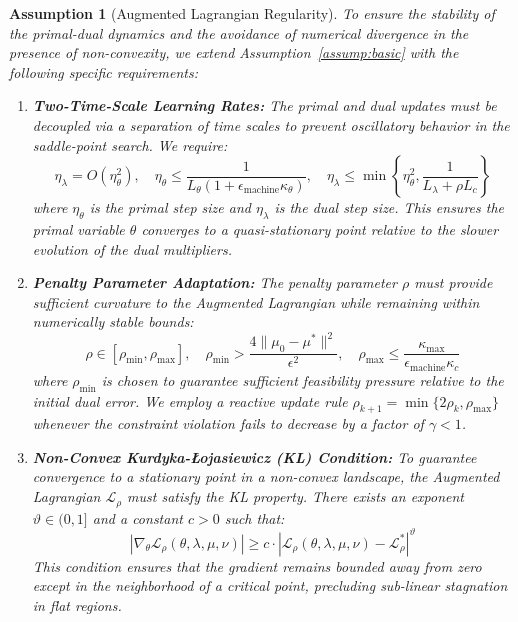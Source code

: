\documentclass[preprint,12pt,authoryear]{elsarticle}
\newtheorem{assumption}{Assumption}
\begin{document}
\begin{assumption}[Augmented Lagrangian Regularity]\label{assump:auglag}
To ensure the stability of the primal-dual dynamics and the avoidance of numerical divergence in the presence of non-convexity, we extend Assumption~\ref{assump:basic} with the following specific requirements:

\begin{enumerate}
    \item \textbf{Two-Time-Scale Learning Rates:} The primal and dual updates must be decoupled via a separation of time scales to prevent oscillatory behavior in the saddle-point search. We require:
    \begin{equation}
        \eta_\lambda = O(\eta_\theta^2), \quad \eta_\theta \leq \frac{1}{L_\theta(1 + \epsilon_{\mathrm{machine}}\kappa_\theta)}, \quad \eta_\lambda \leq \min\left\{\eta_\theta^2, \frac{1}{L_\lambda + \rho L_c}\right\}
    \end{equation}
    where $\eta_\theta$ is the primal step size and $\eta_\lambda$ is the dual step size. This ensures the primal variable $\theta$ converges to a quasi-stationary point relative to the slower evolution of the dual multipliers.

    \item \textbf{Penalty Parameter Adaptation:} The penalty parameter $\rho$ must provide sufficient curvature to the Augmented Lagrangian while remaining within numerically stable bounds:
    \begin{equation}
        \rho \in \left[\rho_{\min}, \rho_{\max}\right], \quad \rho_{\min} > \frac{4\|\mu_0 - \mu^*\|^2}{\epsilon^2}, \quad \rho_{\max} \leq \frac{\kappa_{\max}}{\epsilon_{\mathrm{machine}}\kappa_c}
    \end{equation}
    where $\rho_{\min}$ is chosen to guarantee sufficient feasibility pressure relative to the initial dual error. We employ a reactive update rule $\rho_{k+1} = \min\{2\rho_k, \rho_{\max}\}$ whenever the constraint violation fails to decrease by a factor of $\gamma < 1$.

    \item \textbf{Non-Convex Kurdyka-Łojasiewicz (KL) Condition:} To guarantee convergence to a stationary point in a non-convex landscape, the Augmented Lagrangian $\mathcal{L}_\rho$ must satisfy the KL property. There exists an exponent $\vartheta \in (0,1]$ and a constant $c > 0$ such that:
    \begin{equation}
        |\nabla_\theta \mathcal{L}_\rho(\theta, \lambda, \mu, \nu)| \geq c \cdot |\mathcal{L}_\rho(\theta, \lambda, \mu, \nu) - \mathcal{L}_\rho^*|^\vartheta
    \end{equation}
    This condition ensures that the gradient remains bounded away from zero except in the neighborhood of a critical point, precluding sub-linear stagnation in flat regions.


\end{enumerate}
\end{assumption}
\end{document}
